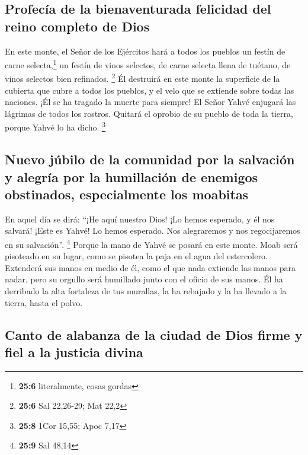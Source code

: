 \hypertarget{profecuxeda-de-la-bienaventurada-felicidad-del-reino-completo-de-dios}{%
\subsection{Profecía de la bienaventurada felicidad del reino completo
de
Dios}\label{profecuxeda-de-la-bienaventurada-felicidad-del-reino-completo-de-dios}}

 En este monte, el Señor de los Ejércitos hará a todos los
pueblos un festín de carne selecta,\footnote{\textbf{25:6} literalmente,
  cosas gordas} un festín de vinos selectos, de carne selecta llena de
tuétano, de vinos selectos bien refinados. \footnote{\textbf{25:6} Sal
  22,26-29; Mat 22,2}  Él destruirá en este monte la
superficie de la cubierta que cubre a todos los pueblos, y el velo que
se extiende sobre todas las naciones.  ¡Él se ha tragado
la muerte para siempre! El Señor Yahvé enjugará las lágrimas de todos
los rostros. Quitará el oprobio de su pueblo de toda la tierra, porque
Yahvé lo ha dicho. \footnote{\textbf{25:8} 1Cor 15,55; Apoc 7,17}

\hypertarget{nuevo-juxfabilo-de-la-comunidad-por-la-salvaciuxf3n-y-alegruxeda-por-la-humillaciuxf3n-de-enemigos-obstinados-especialmente-los-moabitas}{%
\subsection{Nuevo júbilo de la comunidad por la salvación y alegría por
la humillación de enemigos obstinados, especialmente los
moabitas}\label{nuevo-juxfabilo-de-la-comunidad-por-la-salvaciuxf3n-y-alegruxeda-por-la-humillaciuxf3n-de-enemigos-obstinados-especialmente-los-moabitas}}

 En aquel día se dirá: ``¡He aquí nuestro Dios! ¡Lo hemos
esperado, y él nos salvará! ¡Este es Yahvé! Lo hemos esperado. Nos
alegraremos y nos regocijaremos en su salvación''. \footnote{\textbf{25:9}
  Sal 48,14}  Porque la mano de Yahvé se posará en este
monte. Moab será pisoteado en su lugar, como se pisotea la paja en el
agua del estercolero.  Extenderá sus manos en medio de
él, como el que nada extiende las manos para nadar, pero su orgullo será
humillado junto con el oficio de sus manos.  Él ha
derribado la alta fortaleza de tus murallas, la ha rebajado y la ha
llevado a la tierra, hasta el polvo.

\hypertarget{canto-de-alabanza-de-la-ciudad-de-dios-firme-y-fiel-a-la-justicia-divina}{%
\subsection{Canto de alabanza de la ciudad de Dios firme y fiel a la
justicia
divina}\label{canto-de-alabanza-de-la-ciudad-de-dios-firme-y-fiel-a-la-justicia-divina}}

